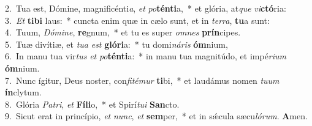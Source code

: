 {2.~}Tua est, Dómine, magnificénti\textit{a}, \textit{et} \textit{po}\textbf{tén}\textbf{ti}a,~* et glória, at\textit{que} \textit{vi}\textbf{ctó}ria:\\
{3.~}\textit{Et} \textbf{ti}\textbf{bi} laus:~* cuncta enim quæ in cælo sunt, et in \textit{ter}\textit{ra}, \textbf{tu}a sunt:\\
{4.~}Tuum, \textit{Dó}\textit{mi}\textit{ne}, \textbf{re}gnum,~* et tu es super \textit{om}\textit{nes} \textbf{prín}cipes.\\
{5.~}Tuæ divítiæ, et \textit{tu}\textit{a} \textit{est} \textbf{gló}\textbf{ri}a:~* tu domi\textit{ná}\textit{ris} \textbf{óm}nium,\\
{6.~}In manu tua vir\textit{tus} \textit{et} \textit{po}\textbf{tén}\textbf{ti}a:~* in manu tua magnitúdo, et impé\textit{ri}\textit{um} \textbf{óm}nium.\\
{7.~}Nunc ígitur, Deus noster, con\textit{fi}\textit{té}\textit{mur} \textbf{ti}bi,~* et laudámus nomen \textit{tu}\textit{um} \textbf{ín}clytum.\\
{8.~}Glória \textit{Pa}\textit{tri}, \textit{et} \textbf{Fí}\textbf{li}o,~* et Spirí\textit{tu}\textit{i} \textbf{San}cto.\\
{9.~}Sicut erat in princípio, \textit{et} \textit{nunc}, \textit{et} \textbf{sem}per,~* et in sǽcula sæcu\textit{ló}\textit{rum}. \textbf{A}men.\\
